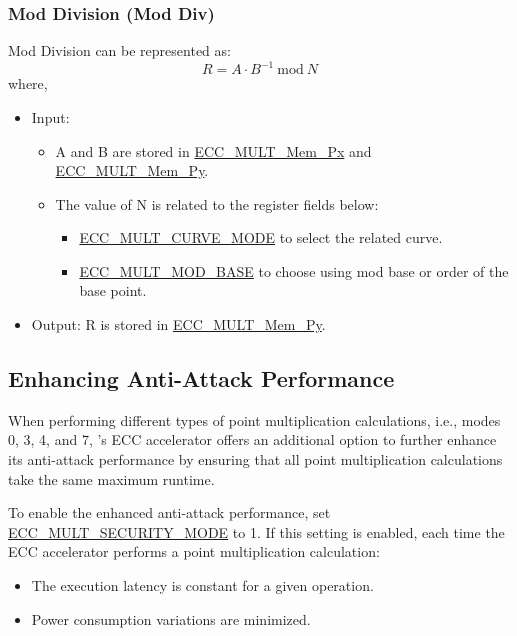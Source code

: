\documentclass[main\_\_EN.tex]{subfiles}
\begin{document}
\subsubsection{Mod Division (Mod Div)}
Mod Division can be represented as:
\[
R = A \cdot {B}^{-1} \ \textrm{mod}\ N
\]
where,
\begin{itemize}
    \item Input:
    \begin{itemize}
        \item A and B are stored in \hyperref[tab:ecc-memory]{ECC\_MULT\_Mem\_Px} and \hyperref[tab:ecc-memory]{ECC\_MULT\_Mem\_Py}.
        \item The value of N is related to the register fields below:
        \begin{itemize}
            \item \hyperref[fielddesc:ECCMULTCURVEMODE]{ECC\_MULT\_CURVE\_MODE} to select the related curve.
            \item \hyperref[fielddesc:ECCMULTMODBASE]{ECC\_MULT\_MOD\_BASE} to choose using mod base or order of the base point.
        \end{itemize}
    \end{itemize}
    \item Output: R is stored in \hyperref[tab:ecc-memory]{ECC\_MULT\_Mem\_Py}.
\end{itemize}

\subsection{Enhancing Anti-Attack Performance}
\label{sec:ecc-anti-attack}

When performing different types of point multiplication calculations, i.e., modes 0, 3, 4, and 7, \chipname{}'s ECC accelerator offers an additional option to further enhance its anti-attack performance by ensuring that all point multiplication calculations take the same maximum runtime.

To enable the enhanced anti-attack performance, set \hyperref[fielddesc:ECCMULTSECURITYMODE]{ECC\_MULT\_SECURITY\_MODE} to 1. If this setting is enabled, each time the ECC accelerator performs a point multiplication calculation:

\begin{itemize}
    \item The execution latency is constant for a given operation.
    \item Power consumption variations are minimized.
\end{itemize}
\end{document}
